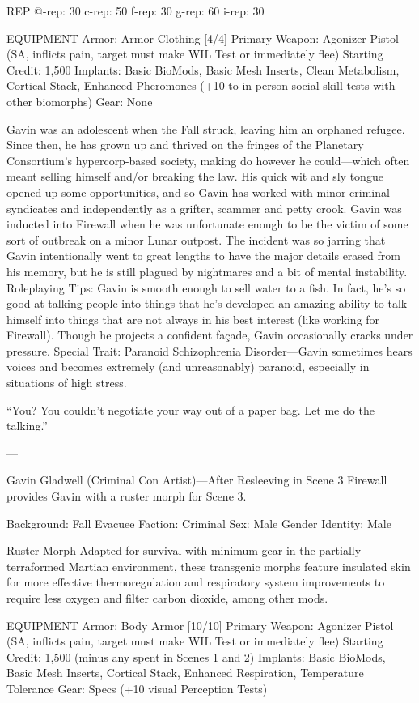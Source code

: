 REP
@-rep:	30
c-rep:	50
f-rep:	30
g-rep:	60
i-rep:	30

EQUIPMENT
Armor: Armor Clothing [4/4]
Primary Weapon: Agonizer Pistol (SA, inflicts pain, target must make WIL Test or immediately flee)
Starting Credit: 1,500
Implants: Basic BioMods, Basic Mesh Inserts, Clean Metabolism, Cortical Stack, Enhanced Pheromones (+10 to in-person social skill tests with other biomorphs)
Gear: None


Gavin was an adolescent when the Fall struck, leaving him an orphaned refugee. Since then, he has grown up and thrived on the fringes of the Planetary Consortium’s hypercorp-based society, making do however he could—which often meant selling himself and/or breaking the law. His quick wit and sly tongue opened up some opportunities, and so Gavin has worked with minor criminal syndicates and independently as a grifter, scammer and petty crook. Gavin was inducted into Firewall when he was unfortunate enough to be the victim of some sort of outbreak on a minor Lunar outpost. The incident was so jarring that Gavin intentionally went to great lengths to have the major details erased from his memory, but he is still plagued by nightmares and a bit of mental instability.
Roleplaying Tips: Gavin is smooth enough to sell water to a fish. In fact, he’s so good at talking people into things that he’s developed an amazing ability to talk himself into things that are not always in his best interest (like working for Firewall). Though he projects a confident façade, Gavin occasionally cracks under pressure.
Special Trait: Paranoid Schizophrenia Disorder—Gavin sometimes hears voices and becomes extremely (and unreasonably) paranoid, especially in situations of high stress.

“You? You couldn't negotiate your way out of a paper bag. Let me do the talking.”

---

Gavin Gladwell (Criminal Con Artist)—After Resleeving in Scene 3
Firewall provides Gavin with a ruster morph for Scene 3.

Background: Fall Evacuee
Faction: Criminal
Sex: Male
Gender Identity: Male

Ruster Morph
Adapted for survival with minimum gear in the partially terraformed Martian environment, these transgenic morphs feature insulated skin for more effective thermoregulation and respiratory system improvements to require less oxygen and filter carbon dioxide, among other mods.

EQUIPMENT
Armor: Body Armor [10/10]
Primary Weapon: Agonizer Pistol (SA, inflicts pain, target must make WIL Test or immediately flee)
Starting Credit: 1,500 (minus any spent in Scenes 1 and 2)
Implants: Basic BioMods, Basic Mesh Inserts, Cortical Stack, Enhanced Respiration, Temperature Tolerance
Gear: Specs (+10 visual Perception Tests)

